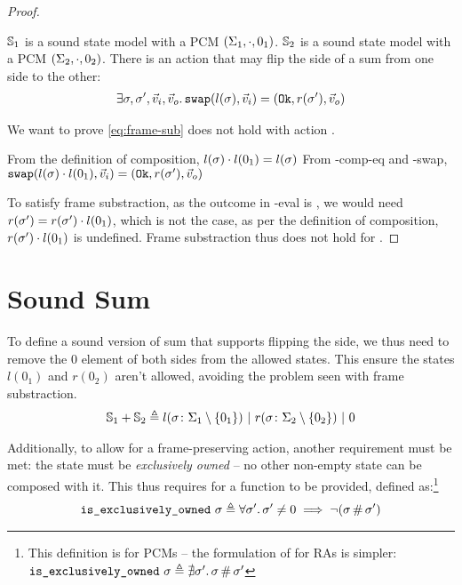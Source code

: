 \begin{proof}


\pfassume \begin{hypvlist}
 $\mathbb S_1$ is a sound state model with a PCM $(\Sigma_1, \cdot, 0_1)$.
 $\mathbb S_2$ is a sound state model with a PCM $(\Sigma_2, \cdot, 0_2)$.
 There is an action \swap{} that may flip the side of a sum from one side to the other: \begin{align*}
		\exists \sigma,\sigma',\vec{v}_i,\vec{v}_o\ldotp \texttt{swap}(l(\sigma),\vec{v}_i)=(\texttt{Ok},r(\sigma'),\vec{v}_o)
	\end{align*}
\end{hypvlist}
	
We want to prove \ref{eq:frame-sub} does not hold with action \swap.

\begin{hypvlist}
	 From the definition of composition, $l(\sigma)\cdot l(0_1)=l(\sigma)$
	 From \hyp{comp-eq} and \hyp{swap}, $\texttt{swap}(l(\sigma)\cdot l(0_1),\vec{v}_i)=(\texttt{Ok}, r(\sigma'),\vec{v}_o)$
\end{hypvlist}
	
To satisfy frame substraction, as the outcome in \hyp{eval} is \Ok, we would need ${r(\sigma') = r(\sigma') \cdot l(0_1)}$, which is not the case, as per the definition of composition, $r(\sigma') \cdot l(0_1)$ is undefined. Frame substraction thus does not hold for \swap.
\end{proof}

\section{Sound Sum}

To define a sound version of sum that supports flipping the side, we thus need to remove the $0$ element of both sides from the allowed states. This ensure the states $l(0_1)$ and $r(0_2)$ aren't allowed, avoiding the problem seen with frame substraction. \begin{align*}
	\mathbb S_1 + \mathbb S_2 \triangleq l(\sigma\colon \Sigma_1\setminus \{0_1\}) ~|~ r(\sigma\colon \Sigma_2\setminus\{0_2\}) ~|~ 0
\end{align*} 


Additionally, to allow for a frame-preserving \swap{} action, another requirement must be met: the state must be \textit{exclusively owned} -- no other non-empty state can be composed with it. This thus requires for a \isexowned{} function to be provided, defined as:\footnote{This definition is for PCMs -- the formulation of \isexowned{} for RAs is simpler: $\texttt{is\_exclusively\_owned}~\sigma \triangleq \nexists \sigma'\ldotp \sigma\operatorname{\#}\sigma'$}%
\begin{align*}
	\texttt{is\_exclusively\_owned}~\sigma \triangleq \forall\sigma'\ldotp \sigma'\neq0\implies\neg(\sigma\operatorname{\#}\sigma')
\end{align*}

